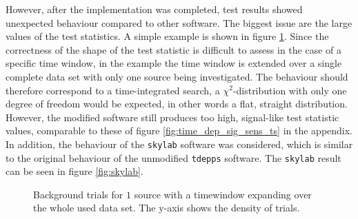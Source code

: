 However, after the implementation was completed, test results showed unexpected behaviour compared to other software.
The biggest issue are the large values of the test statistics.
A simple example is shown in figure \ref{fig:fail_example}.
Since the correctness of the shape of the test statistic is difficult to assess in the case of a specific time window, in the example the time window is extended over a single complete data set with only one source being investigated.
The behaviour should therefore correspond to a time-integrated search, a $\chi^2$-distribution with only one degree of freedom would be expected, in other words a flat, straight distribution.
However, the modified software still produces too high, signal-like test statistic values, comparable to these of figure \ref{fig:time_dep_sig_sens_ts} in the appendix.
In addition, the behaviour of the \texttt{skylab} software was considered, which is similar to the original behaviour of the unmodified \texttt{tdepps} software.
The \texttt{skylab} result can be seen in figure \ref{fig:skylab}.
\begin{figure}%
    \centering
    \qquad
    \caption{Background trials for $\num{1}$ source with a timewindow expanding over the whole used data set. The y-axis shows the density of trials.}%
    \label{fig:fail_example}%
\end{figure}
